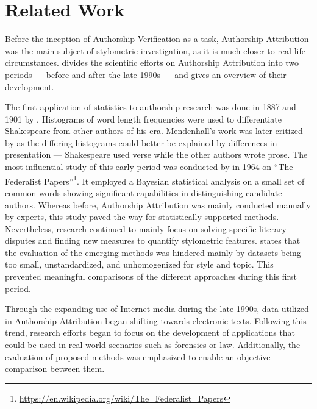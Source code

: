 \chapter{Related Work}\label{related_work}
Before the inception of Authorship Verification as a task, Authorship Attribution was the main subject of stylometric investigation, as it is much closer to real-life circumstances.
\cite{stamatatos2009survey} divides the scientific efforts on Authorship Attribution into two periods --- before and after the late 1990s --- and gives an overview of their development.

The first application of statistics to authorship research was done in 1887 and 1901 by \citeauthor{mendenhall1887characteristic}.
Histograms of word length frequencies were used to differentiate Shakespeare from other authors of his era.
Mendenhall's work was later critized by \cite{williams1975mendenhall} as the differing histograms could better be explained by differences in presentation --- Shakespeare used verse while the other authors wrote prose.
The most influential study of this early period was conducted by \citeauthor{mosteller1964inference} in 1964 on ``The Federalist Papers''\footnote{\url{https://en.wikipedia.org/wiki/The_Federalist_Papers}}.
It employed a Bayesian statistical analysis on a small set of common words showing significant capabilities in distinguishing candidate authors.
Whereas before, Authorship Attribution was mainly conducted manually by experts, this study paved the way for statistically supported methods.
Nevertheless, research continued to mainly focus on solving specific literary disputes and finding new measures to quantify stylometric features.
\citeauthor{stamatatos2009survey} states that the evaluation of the emerging methods was hindered mainly by datasets being too small, unstandardized, and unhomogenized for style and topic.
This prevented meaningful comparisons of the different approaches during this first period.

Through the expanding use of Internet media during the late 1990s, data utilized in Authorship Attribution began shifting towards electronic texts.
Following this trend, research efforts began to focus on the development of applications that could be used in real-world scenarios such as forensics or law.
Additionally, the evaluation of proposed methods was emphasized to enable an objective comparison between them.

